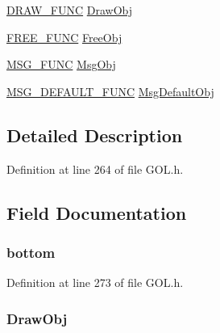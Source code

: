\begin{DoxyCompactItemize}
\item 
\hyperlink{_g_o_l_8h_a65ec1f1db8f53555f8b1a7d8a40ea377}{D\+R\+A\+W\+\_\+\+F\+U\+N\+C} \hyperlink{struct_o_b_j___h_e_a_d_e_r_a1e6b468c50efe2293f245bceb4b05c93}{Draw\+Obj}
\item 
\hyperlink{_g_o_l_8h_a7d58b45b86f30cb213ddf129ba4b8cf7}{F\+R\+E\+E\+\_\+\+F\+U\+N\+C} \hyperlink{struct_o_b_j___h_e_a_d_e_r_a9ecc5829e36169df1cbe572a8d56e94d}{Free\+Obj}
\item 
\hyperlink{_g_o_l_8h_a22fd687fea953ee250f71ab2997615b9}{M\+S\+G\+\_\+\+F\+U\+N\+C} \hyperlink{struct_o_b_j___h_e_a_d_e_r_a484328d4799162c846f3941a360571f4}{Msg\+Obj}
\item 
\hyperlink{_g_o_l_8h_a7d8961da1a39dd98d8b9ddc5f86f66dc}{M\+S\+G\+\_\+\+D\+E\+F\+A\+U\+L\+T\+\_\+\+F\+U\+N\+C} \hyperlink{struct_o_b_j___h_e_a_d_e_r_a9bb9e848bcb49dba279d1969c9d35580}{Msg\+Default\+Obj}
\end{DoxyCompactItemize}


\subsection{Detailed Description}


Definition at line 264 of file G\+O\+L.\+h.



\subsection{Field Documentation}
\hypertarget{struct_o_b_j___h_e_a_d_e_r_a85afe4f0d49adc47a2c4e5e7bf20f219}{}
\subsubsection[{bottom}]{ bottom}\label{struct_o_b_j___h_e_a_d_e_r_a85afe4f0d49adc47a2c4e5e7bf20f219}


Definition at line 273 of file G\+O\+L.\+h.

\hypertarget{struct_o_b_j___h_e_a_d_e_r_a1e6b468c50efe2293f245bceb4b05c93}{}
\subsubsection[{Draw\+Obj}]{ Draw\+Obj}\label{struct_o_b_j___h_e_a_d_e_r_a1e6b468c50efe2293f245bceb4b05c93}


